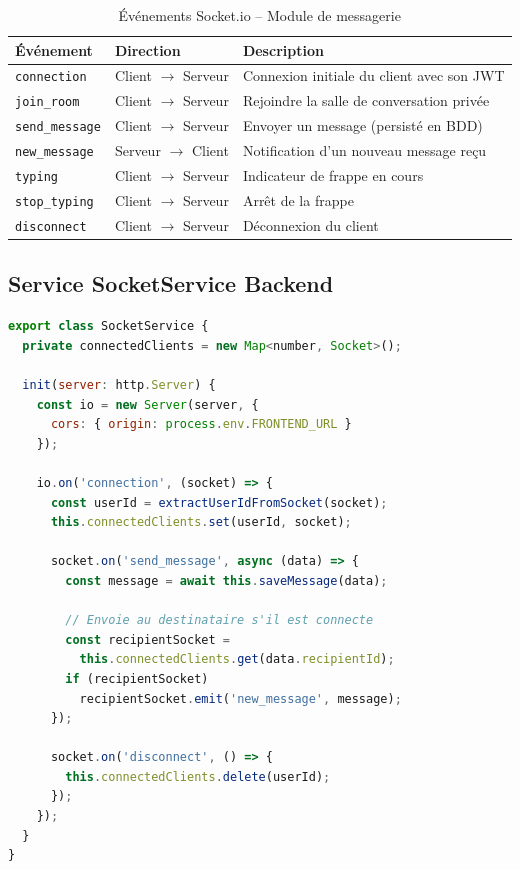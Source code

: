 \begin{table}[H]
\centering
\renewcommand{\arraystretch}{1.4}
\begin{tabular}{|l|l|p{7cm}|}
\hline
\rowcolor[HTML]{D5E8D4}
\textbf{Événement} & \textbf{Direction} & \textbf{Description} \\ \hline
\texttt{connection} & Client $\rightarrow$ Serveur & Connexion initiale du client avec son JWT \\ \hline
\texttt{join\_room} & Client $\rightarrow$ Serveur & Rejoindre la salle de conversation privée \\ \hline
\texttt{send\_message} & Client $\rightarrow$ Serveur & Envoyer un message (persisté en BDD) \\ \hline
\texttt{new\_message} & Serveur $\rightarrow$ Client & Notification d'un nouveau message reçu \\ \hline
\texttt{typing} & Client $\rightarrow$ Serveur & Indicateur de frappe en cours \\ \hline
\texttt{stop\_typing} & Client $\rightarrow$ Serveur & Arrêt de la frappe \\ \hline
\texttt{disconnect} & Client $\rightarrow$ Serveur & Déconnexion du client \\ \hline
\end{tabular}
\caption{Événements Socket.io -- Module de messagerie}
\end{table}

\subsection{Service SocketService Backend}
\begin{lstlisting}[language=JavaScript,
    caption=Extrait SocketService.ts -- Gestion des événements]
export class SocketService {
  private connectedClients = new Map<number, Socket>();

  init(server: http.Server) {
    const io = new Server(server, {
      cors: { origin: process.env.FRONTEND_URL }
    });

    io.on('connection', (socket) => {
      const userId = extractUserIdFromSocket(socket);
      this.connectedClients.set(userId, socket);

      socket.on('send_message', async (data) => {
        const message = await this.saveMessage(data);

        // Envoie au destinataire s'il est connecte
        const recipientSocket =
          this.connectedClients.get(data.recipientId);
        if (recipientSocket)
          recipientSocket.emit('new_message', message);
      });

      socket.on('disconnect', () => {
        this.connectedClients.delete(userId);
      });
    });
  }
}
\end{lstlisting}


